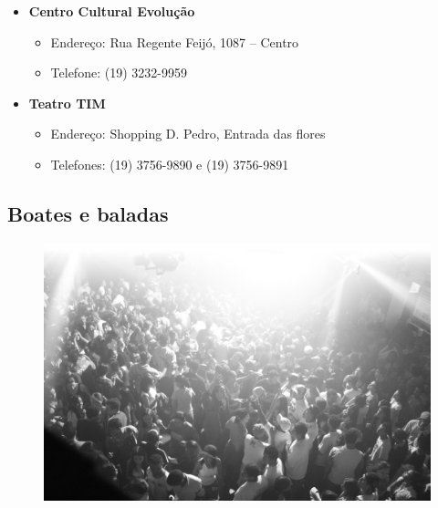\begin{itemize}
\item  \textbf{Centro Cultural Evolução}
    \begin{itemize}
        \item  Endereço: Rua Regente Feijó, 1087 -- Centro
        \item  Telefone: (19) 3232-9959
    \end{itemize}

\item  \textbf{Teatro TIM}
    \begin{itemize}
        \item  Endereço: Shopping D. Pedro, Entrada das flores
        \item  Telefones: (19) 3756-9890 e (19) 3756-9891
    \end{itemize}

\end{itemize}

\subsection{Boates e baladas}

\begin{figure}[hb!]
    \centering
    \includegraphics[scale=0.15,keepaspectratio=true]{img/imgs/7-diversao/-053.jpg}
\end{figure}

